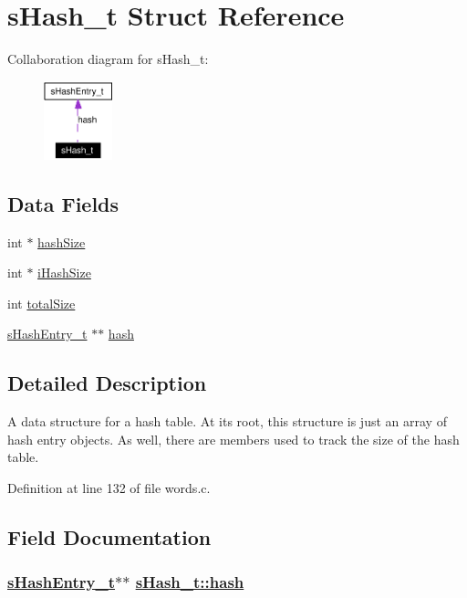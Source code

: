 \hypertarget{structsHash__t}{
\section{s\-Hash\_\-t Struct Reference}
\label{structsHash__t}
}
Collaboration diagram for s\-Hash\_\-t:\begin{figure}[H]
\begin{center}
\leavevmode
\includegraphics[width=56pt]{structsHash__t__coll__graph}
\end{center}
\end{figure}
\subsection*{Data Fields}
\begin{CompactItemize}
\item 
int $\ast$ \hyperlink{structsHash__t_o0}{hash\-Size}
\item 
int $\ast$ \hyperlink{structsHash__t_o1}{i\-Hash\-Size}
\item 
int \hyperlink{structsHash__t_o2}{total\-Size}
\item 
\hyperlink{structsHashEntry__t}{s\-Hash\-Entry\_\-t} $\ast$$\ast$ \hyperlink{structsHash__t_o3}{hash}
\end{CompactItemize}


\subsection*{Detailed Description}
A data structure for a hash table. At its root, this structure is just an array of hash entry objects. As well, there are members used to track the size of the hash table.



Definition at line 132 of file words.c.

\subsection*{Field Documentation}
\hypertarget{structsHash__t_o3}{
\subsubsection[hash]{\setlength{\rightskip}{0pt plus 5cm}\hyperlink{structsHashEntry__t}{s\-Hash\-Entry\_\-t}$\ast$$\ast$ \hyperlink{structsHash__t_o3}{s\-Hash\_\-t::hash}}}
\label{structsHash__t_o3}


